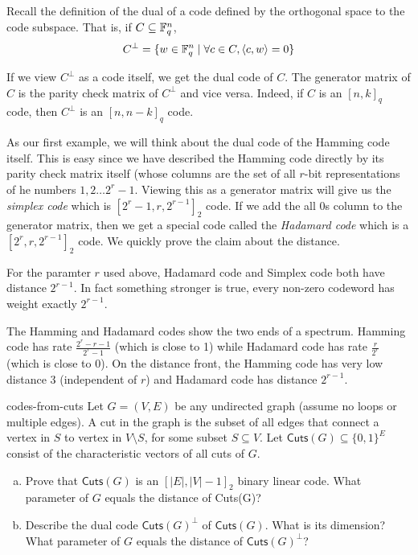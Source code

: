 Recall the definition of the dual of a code defined by the orthogonal space to the code subspace. That is, if $C \subseteq {\mathbb{F}}_q^n$,
$$C^{\perp} = \{ w \in {\mathbb{F}}_q^n \mid \forall c \in C, \langle c,w \rangle = 0 \}$$

If we view $C^\perp$ as a code itself, we get the dual code of $C$. The generator matrix of $C$ is the parity check matrix of $C^\perp$ and vice versa. Indeed, if $C$ is an $[n,k]_q$ code, then $C^\perp$ is an $[n,n-k]_q$ code. 

As our first example, we will think about the dual code of the Hamming code itself. This is easy since we have described the Hamming code directly by its parity check matrix itself (whose columns are the set of all $r$-bit representations of he numbers $1,2 \ldots 2^r-1$. Viewing this as a generator matrix will give us the \textit{simplex code} which is $[2^r-1,r,2^{r-1}]_2$ code. If we add the all $0$s column to the generator matrix, then we get a special code called the \textit{Hadamard code} which is a $[2^r,r,2^{r-1}]_2$ code. We quickly prove the claim about the distance.

\begin{exercise}
For the paramter $r$ used above, Hadamard code and Simplex code both have distance $2^{r-1}$. In fact something stronger is true, every non-zero codeword has weight exactly $2^{r-1}$.
\end{exercise}

The Hamming and Hadamard codes show the two ends of a spectrum. Hamming code has rate $\frac{2^r-r-1}{2^r-1}$ (which is close to 1) while Hadamard code has rate $\frac{r}{2^r}$ (which is close to $0$). On the distance front, the Hamming code has very low distance $3$ (independent of $r$) and Hadamard code has distance $2^{r-1}$.

\begin{exercise-prob}
\begin{show-ps3}{codes-from-cuts}
Let $G=(V,E)$ be any undirected graph (assume no loops or multiple edges). A cut in the graph is the subset of all edges that connect a vertex in $S$ to vertex in $V \setminus S$, for some subset $S \subseteq V$. Let $\mathsf{Cuts}(G) \subseteq \{0,1\}^E$ consist of the characteristic vectors of all cuts of $G$.
\begin{enumerate}[(a)]
\item Prove that $\mathsf{Cuts}(G)$ is an $[|E|,|V|-1]_2$ binary linear code. What parameter of $G$ equals the distance of Cuts(G)?
\item Describe the dual code $\mathsf{Cuts}(G)^\perp$ of $\mathsf{Cuts}(G)$. What is its dimension? What parameter of $G$
equals the distance of $\mathsf{Cuts}(G)^\perp$?
\end{enumerate}
\end{show-ps3}
\end{exercise-prob}

